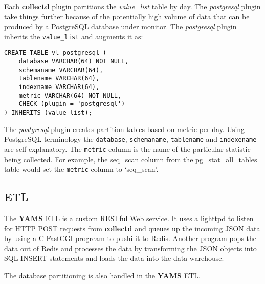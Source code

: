 \documentclass[a4paper,twoside,12pt]{article}
\begin{document}
Each \textbf{collectd} plugin partitions the \textit{value\_list} table by day.
The \textit{postgresql} plugin take things further because of the potentially
high volume of data that can be produced by a PostgreSQL database under
monitor.  The \textit{postgresql} plugin inherits the \texttt{value\_list} and
augments it as:

\lstset{language=sql}
\begin{lstlisting}
CREATE TABLE vl_postgresql (
    database VARCHAR(64) NOT NULL,
    schemaname VARCHAR(64),
    tablename VARCHAR(64),
    indexname VARCHAR(64),
    metric VARCHAR(64) NOT NULL,
    CHECK (plugin = 'postgresql')
) INHERITS (value_list);
\end{lstlisting}

The \textit{postgresql} plugin creates partition tables based on metric per
day.  Using PostgreSQL terminology the \texttt{database}, \texttt{schemaname},
\texttt{tablename} and \texttt{indexename} are self-explanatory.  The
\texttt{metric} column is the name of the particular statistic being collected.
For example, the seq\_scan column from the pg\_stat\_all\_tables table would
set the \texttt{metric} column to `seq\_scan'.

\subsection{ETL}

The \textbf{YAMS} ETL is a custom RESTful Web service.  It uses a lighttpd to
listen for HTTP POST requests from \textbf{collectd} and queues up the incoming
JSON data by using a C FastCGI progream to pushi it to Redis.  Another program
pops the data out of Redis and processes the data by transforming the JSON
objects into SQL INSERT statements and loads the data into the data warehouse.

The database partitioning is also handled in the \textbf{YAMS} ETL.
\end{document}
